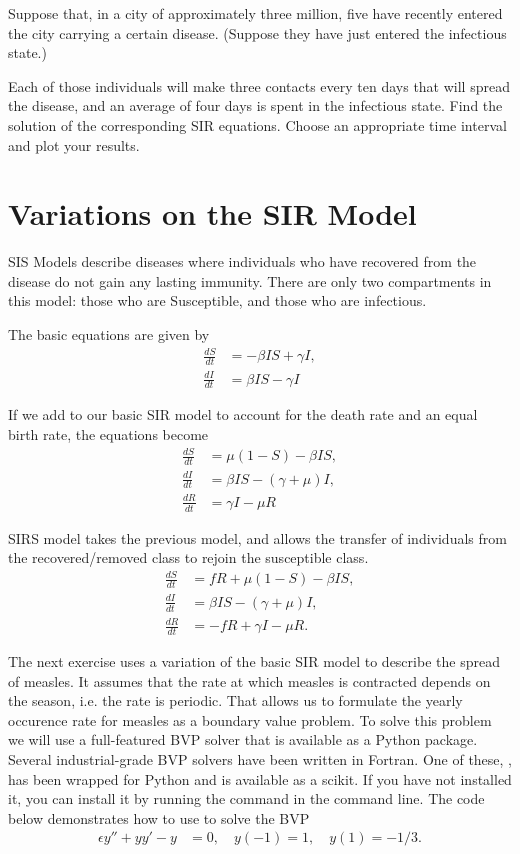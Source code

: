 \begin{problem}
Suppose that, in a city of approximately three million, five have recently entered the city carrying a certain disease.
(Suppose they have just entered the infectious state.) 

Each of those individuals will make three contacts every ten days that will spread the disease, and an average of four days is spent in the infectious state.
Find the solution of the corresponding SIR equations.
Choose an appropriate time interval and plot your results.
\end{problem}

\section*{Variations on the SIR Model}

SIS Models describe diseases where individuals who have recovered from the disease do not gain 
any lasting immunity.
There are only two compartments in this model: those who are Susceptible, and those who are infectious.

The basic equations are given by
\begin{align*}
\frac{dS}{dt} &=-\beta I S + \gamma I ,\\
\frac{dI}{dt} &= \beta I S-\gamma I
\end{align*}

If we add to our basic SIR model to account for the death rate and an equal birth rate, the equations become
\begin{align*}
\frac{dS}{dt} &=\mu(1 -S) - \beta I S,\\
\frac{dI}{dt} &= \beta I S - (\gamma + \mu)I, \\
\frac{dR}{dt} &= \gamma I - \mu R
\end{align*}

SIRS model takes the previous model, and allows the transfer of individuals from the recovered/removed class to rejoin the susceptible class. 
\begin{align*}
\frac{dS}{dt} &= fR + \mu(1 -S) - \beta I S,\\
\frac{dI}{dt} &= \beta I S - (\gamma + \mu)I, \\
\frac{dR}{dt} &= -fR + \gamma I - \mu R.
\end{align*}

The next exercise uses a variation of the basic SIR model to describe the spread of measles. 
It assumes that the rate at which measles is contracted depends on the season, i.e. the rate is periodic.
That allows us to formulate the yearly occurence rate for measles as a boundary value problem.
To solve this problem we will use a full-featured BVP solver that is available as a Python package.
Several industrial-grade BVP solvers have been written in Fortran.
One of these, , has been wrapped for Python and is available as a scikit.
If you have not installed it, you can install it by running the command  in the command line.
The code below demonstrates how to use  to solve the BVP
\begin{align*}
	\epsilon y'' + yy' - y &= 0, \quad y(-1) = 1, \quad y(1) = -1/3.
\end{align*}

